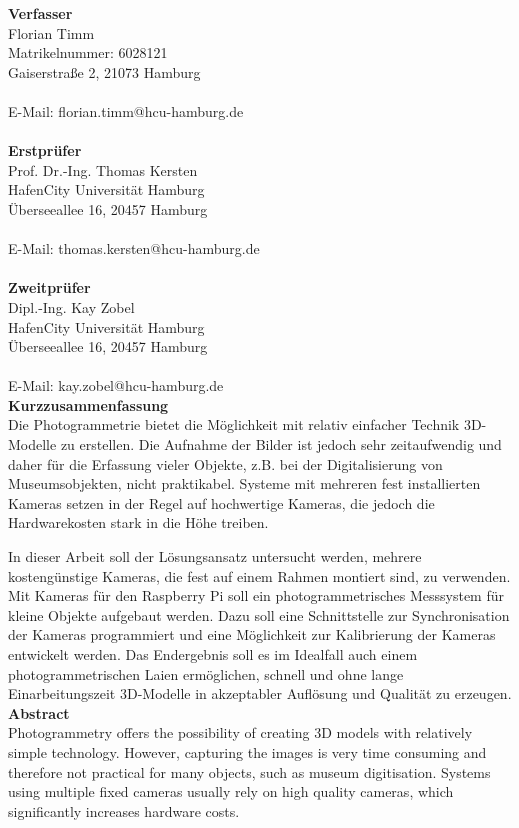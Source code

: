 \documentclass[a4paper,12pt,bibliography=totoc, listof=totoc, titlepage]{scrreprt}
\begin{document}
\vspace{2cm}
\noindent\textbf{\large Verfasser}\\
Florian Timm\\
Matrikelnummer: 6028121\\
Gaiserstraße 2, 21073 Hamburg\\
\\
E-Mail: florian.timm@hcu-hamburg.de\\
\vspace{3cm}\\
\noindent\textbf{\large Erstprüfer}\\
Prof. Dr.-Ing. Thomas Kersten\\
HafenCity Universität Hamburg\\
Überseeallee 16, 20457 Hamburg\\
\\
E-Mail: thomas.kersten@hcu-hamburg.de\\
\vspace{3cm}\\
\textbf{\large Zweitprüfer}\\
Dipl.-Ing. Kay Zobel\\
HafenCity Universität Hamburg\\
Überseeallee 16, 20457 Hamburg\\
\\
E-Mail: kay.zobel@hcu-hamburg.de\\
\newpage
\noindent\textbf{\large Kurzzusammenfassung}\\
Die Photogrammetrie bietet die Möglichkeit mit relativ einfacher Technik 3D-Modelle zu erstellen. Die Aufnahme der Bilder ist jedoch sehr zeitaufwendig und daher für die Erfassung vieler Objekte, z.B. bei der Digitalisierung von Museumsobjekten, nicht praktikabel. Systeme mit mehreren fest installierten Kameras setzen in der Regel auf hochwertige Kameras, die jedoch die Hardwarekosten stark in die Höhe treiben.

In dieser Arbeit soll der Lösungsansatz untersucht werden, mehrere kostengünstige Kameras, die fest auf einem Rahmen montiert sind, zu verwenden. Mit Kameras für den Raspberry Pi soll ein photogrammetrisches Messsystem für kleine Objekte aufgebaut werden. Dazu soll eine Schnittstelle zur Synchronisation der Kameras programmiert und eine Möglichkeit zur Kalibrierung der Kameras entwickelt werden. Das Endergebnis soll es im Idealfall auch einem photogrammetrischen Laien ermöglichen, schnell und ohne lange Einarbeitungszeit 3D-Modelle in akzeptabler Auflösung und Qualität zu erzeugen.
\vspace{2cm}\\
\noindent\textbf{\large Abstract}\\
Photogrammetry offers the possibility of creating 3D models with relatively simple technology. However, capturing the images is very time consuming and therefore not practical for many objects, such as museum digitisation. Systems using multiple fixed cameras usually rely on high quality cameras, which significantly increases hardware costs.
\end{document}
